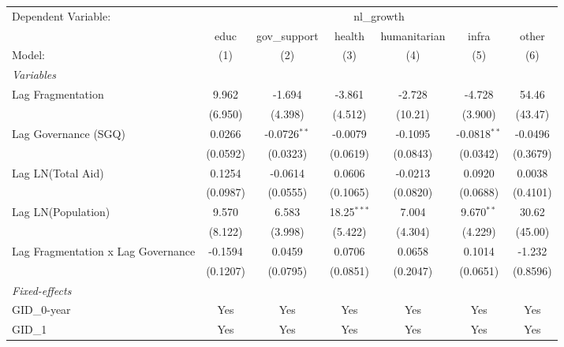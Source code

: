 \begin{tabular}{lcccccc}
   \tabularnewline \midrule \midrule
   Dependent Variable: & \multicolumn{6}{c}{nl\_growth}\\
                                      & educ     & gov\_support   & health        & humanitarian & infra          & other \\   
   Model:                             & (1)      & (2)            & (3)           & (4)          & (5)            & (6)\\  
   \midrule
   \emph{Variables}\\
   Lag Fragmentation                  & 9.962    & -1.694         & -3.861        & -2.728       & -4.728         & 54.46\\   
                                      & (6.950)  & (4.398)        & (4.512)       & (10.21)      & (3.900)        & (43.47)\\   
   Lag Governance (SGQ)               & 0.0266   & -0.0726$^{**}$ & -0.0079       & -0.1095      & -0.0818$^{**}$ & -0.0496\\   
                                      & (0.0592) & (0.0323)       & (0.0619)      & (0.0843)     & (0.0342)       & (0.3679)\\   
   Lag LN(Total Aid)                  & 0.1254   & -0.0614        & 0.0606        & -0.0213      & 0.0920         & 0.0038\\   
                                      & (0.0987) & (0.0555)       & (0.1065)      & (0.0820)     & (0.0688)       & (0.4101)\\   
   Lag LN(Population)                 & 9.570    & 6.583          & 18.25$^{***}$ & 7.004        & 9.670$^{**}$   & 30.62\\   
                                      & (8.122)  & (3.998)        & (5.422)       & (4.304)      & (4.229)        & (45.00)\\   
   Lag Fragmentation x Lag Governance & -0.1594  & 0.0459         & 0.0706        & 0.0658       & 0.1014         & -1.232\\   
                                      & (0.1207) & (0.0795)       & (0.0851)      & (0.2047)     & (0.0651)       & (0.8596)\\   
   \midrule
   \emph{Fixed-effects}\\
   GID\_0-year                        & Yes      & Yes            & Yes           & Yes          & Yes            & Yes\\  
   GID\_1                             & Yes      & Yes            & Yes           & Yes          & Yes            & Yes\\  

\end{tabular}

